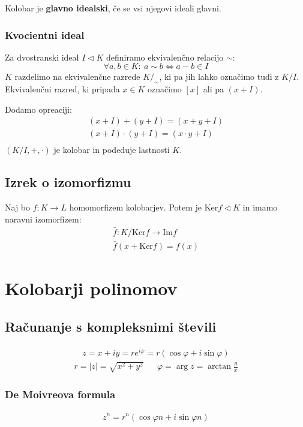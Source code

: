 	Kolobar je \textbf{glavno idealski}, če se vsi njegovi ideali glavni.

	\subsubsection*{Kvocientni ideal}
	Za dvostranski ideal $I \lhd K$ definiramo ekvivalenčno relacijo $\sim$:
	\[ \forall a,b \in K:\ a \sim b \iff a-b \in I \]
	$K$ razdelimo na ekvivalenčne razrede $K/_\sim$, ki pa jih lahko označimo tudi z $K/I$. Ekvivalenčni razred, ki pripada $x \in K$ označimo $[x]$ ali pa $(x+I)$.

	Dodamo opreaciji:
	\begin{align*}
		(x+I) + (y + I) = (x+y+I) \\
		(x+I) \cdot (y + I) = (x\cdot y+I) \\
	\end{align*}
	$(K/I, +, \cdot)$ je kolobar in podeduje lastnosti $K$.

	\subsection*{Izrek o izomorfizmu}
	Naj bo $f: K \to L$ homomorfizem kolobarjev. Potem je $\text{Ker}f \lhd K$ in imamo naravni izomorfizem:
	\begin{align*}
		\bar{f}: K/\text{Ker}f \to \text{Im}f\\
		\bar{f} (x + \text{Ker}f) = f(x)
	\end{align*}

	\section{Kolobarji polinomov}
	\subsection*{Računanje s kompleksnimi števili}
	\begin{gather*}
		z = x + iy = r e^{i\varphi} = r\left( \cos \varphi + i \sin \varphi \right)
	\end{gather*}
	\begin{align*}
		r = |z| = \sqrt{x^2 + y^2} && \varphi = \arg z = \arctan \frac{y}{x}
	\end{align*}

	\subsubsection*{De Moivreova formula}
	\begin{align*}
		z^n = r^n\left( \cos \varphi n + i \sin \varphi n \right)
	\end{align*}

